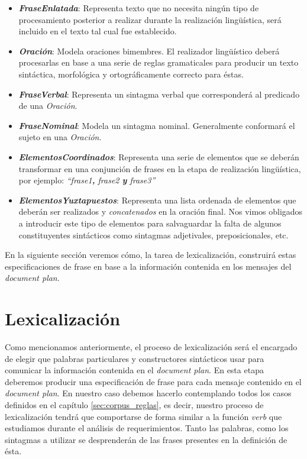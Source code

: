 \medskip
\begin{itemize}
\item{\emph{\textbf{FraseEnlatada}}: Representa texto que no necesita ningún tipo de procesamiento posterior a realizar durante la realización lingüística, será incluido en el texto tal cual fue establecido.}
\item{\emph{\textbf{Oración}}: Modela oraciones bimembres. El realizador lingüístico deberá procesarlas en base a una serie de reglas gramaticales para producir un texto sintáctica, morfológica y ortográficamente correcto para éstas.}
\item{\emph{\textbf{FraseVerbal}}: Representa un sintagma verbal que corresponderá al predicado de una \emph{Oración}.}
\item{\emph{\textbf{FraseNominal}}: Modela un sintagma nominal. Generalmente conformará el sujeto en una \emph{Oración}.}
\item{\emph{\textbf{ElementosCoordinados}}: Representa una serie de elementos que se deberán transformar en una conjunción de frases en la etapa de realización lingüística, por ejemplo: \emph{``frase1\textbf{,} frase2 \textbf{y} frase3''}}
\item{\emph{\textbf{ElementosYuxtapuestos}}: Representa una lista ordenada de elementos que deberán ser realizados y \emph{concatenados} en la oración final. Nos vimos obligados a introducir este tipo de elementos para salvaguardar la falta de algunos constituyentes sintácticos como sintagmas adjetivales, preposicionales, etc.}
\end{itemize}

En la siguiente sección veremos cómo, la tarea de lexicalización, construirá estas especificaciones de frase en base a la información contenida en los mensajes del \textit{document plan}.

\section{Lexicalización}
\label{sec:microplanning_lexicalization}

Como mencionamos anteriormente, el proceso de lexicalización será el encargado de elegir que palabras particulares y constructores sintácticos usar para comunicar la información contenida en el \textit{document plan}. En esta etapa deberemos producir una especificación de frase para cada mensaje contenido en el \textit{document plan}. En nuestro caso debemos hacerlo contemplando todos los casos definidos en el capítulo \ref{sec:corpus_reglas}, es decir, nuestro proceso de lexicalización tendrá que comportarse de forma similar a la función \emph{verb} que estudiamos durante el análisis de requerimientos. Tanto las palabras, como los sintagmas a utilizar se desprenderán de las frases presentes en la definición de ésta.

